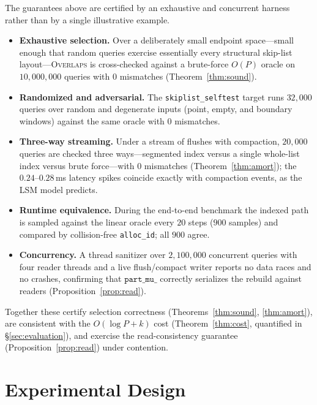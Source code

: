 \documentclass[10pt]{article}
\theoremstyle{definition}
\begin{document}
The guarantees above are certified by an exhaustive and concurrent harness rather
than by a single illustrative example.
\begin{itemize}
\item \textbf{Exhaustive selection.} Over a deliberately small endpoint space---small
  enough that random queries exercise essentially every structural skip-list
  layout---\textsc{Overlaps} is cross-checked against a brute-force $O(P)$ oracle
  on $10{,}000{,}000$ queries with $0$ mismatches (Theorem~\ref{thm:sound}).
\item \textbf{Randomized and adversarial.} The \texttt{skiplist\_selftest} target
  runs $32{,}000$ queries over random and degenerate inputs (point, empty, and
  boundary windows) against the same oracle with $0$ mismatches.
\item \textbf{Three-way streaming.} Under a stream of flushes with compaction,
  $20{,}000$ queries are checked three ways---segmented index versus a single
  whole-list index versus brute force---with $0$ mismatches
  (Theorem~\ref{thm:amort}); the $0.24$--$0.28$\,ms latency spikes coincide
  exactly with compaction events, as the LSM model predicts.
\item \textbf{Runtime equivalence.} During the end-to-end benchmark the indexed
  path is sampled against the linear oracle every $20$ steps ($900$ samples) and
  compared by collision-free \texttt{alloc\_id}; all $900$ agree.
\item \textbf{Concurrency.} A thread sanitizer over $2{,}100{,}000$ concurrent
  queries with four reader threads and a live flush/compact writer reports no
  data races and no crashes, confirming that $\texttt{part\_mu\_}$ correctly
  serializes the rebuild against readers (Proposition~\ref{prop:read}).
\end{itemize}
Together these certify selection correctness (Theorems~\ref{thm:sound},
\ref{thm:amort}), are consistent with the $O(\log P + k)$ cost
(Theorem~\ref{thm:cost}, quantified in \S\ref{sec:evaluation}), and exercise the
read-consistency guarantee (Proposition~\ref{prop:read}) under contention.

\section{Experimental Design}
\label{sec:expdesign}
\end{document}
